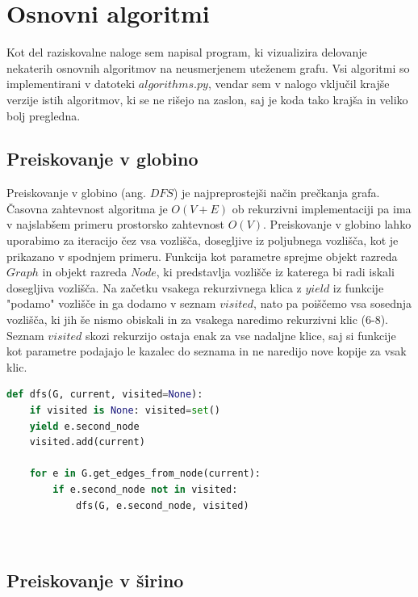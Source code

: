 \documentclass[11pt]{article}
\begin{document}
\section{Osnovni algoritmi}

Kot del raziskovalne naloge sem napisal program, ki vizualizira delovanje nekaterih osnovnih algoritmov na neusmerjenem uteženem grafu. Vsi algoritmi so implementirani v datoteki $algorithms.py$, vendar sem v nalogo vključil krajše verzije istih algoritmov, ki se ne rišejo na zaslon, saj je koda tako krajša in veliko bolj pregledna.

\subsection{Preiskovanje v globino}

Preiskovanje v globino (ang. $DFS$) je najpreprostejši način prečkanja grafa. Časovna zahtevnost algoritma je $O(V + E)$ ob rekurzivni implementaciji pa ima v najslabšem primeru prostorsko zahtevnost $O(V)$. Preiskovanje v globino lahko uporabimo za iteracijo čez vsa vozlišča, dosegljive iz poljubnega vozlišča, kot je prikazano v spodnjem primeru. Funkcija kot parametre sprejme objekt razreda $Graph$ in objekt razreda $Node$, ki predstavlja vozlišče iz katerega bi radi iskali dosegljiva vozlišča. Na začetku vsakega rekurzivnega klica z $yield$ iz funkcije "podamo" vozlišče in ga dodamo v seznam $visited$, nato pa poiščemo vsa sosednja vozlišča, ki jih še nismo obiskali in za vsakega naredimo rekurzivni klic (6-8). Seznam $visited$ skozi rekurzijo ostaja enak za vse nadaljne klice, saj si funkcije kot parametre podajajo le kazalec do seznama in ne naredijo nove kopije za vsak klic. \cite{dfs}

\begin{lstlisting}[language=Python, caption=Presikovanje v globino]
def dfs(G, current, visited=None):
	if visited is None: visited=set()
    yield e.second_node    
    visited.add(current)

    for e in G.get_edges_from_node(current):
        if e.second_node not in visited:
            dfs(G, e.second_node, visited)

    
\end{lstlisting}

\subsection{Preiskovanje v širino}
\end{document}
